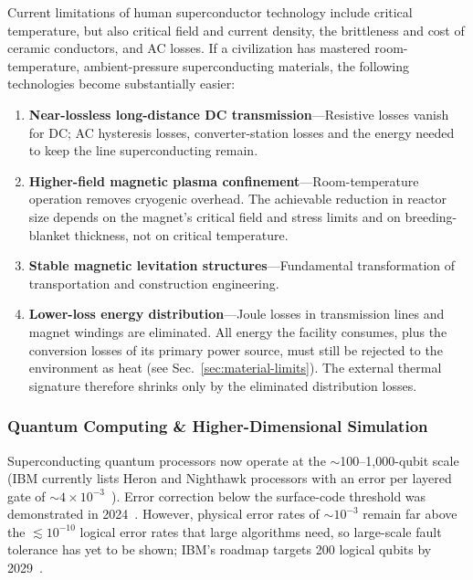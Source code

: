\documentclass[aps,prd,twocolumn,superscriptaddress,nofootinbib]{revtex4-2}
\begin{document}
Current limitations of human superconductor technology include critical temperature, but also critical field and current density, the brittleness and cost of ceramic conductors, and AC losses. If a civilization has mastered room-temperature, ambient-pressure superconducting materials, the following technologies become substantially easier:

\begin{enumerate}
  \item \textbf{Near-lossless long-distance DC transmission}---Resistive losses vanish for DC; AC hysteresis losses, converter-station losses and the energy needed to keep the line superconducting remain.
  \item \textbf{Higher-field magnetic plasma confinement}---Room-temperature operation removes cryogenic overhead. The achievable reduction in reactor size depends on the magnet's critical field and stress limits and on breeding-blanket thickness, not on critical temperature.
  \item \textbf{Stable magnetic levitation structures}---Fundamental transformation of transportation and construction engineering.
  \item \textbf{Lower-loss energy distribution}---Joule losses in transmission lines and magnet windings are eliminated. All energy the facility consumes, plus the conversion losses of its primary power source, must still be rejected to the environment as heat (see Sec.~\ref{sec:material-limits}). The external thermal signature therefore shrinks only by the eliminated distribution losses.
\end{enumerate}

\subsubsection{Quantum Computing \& Higher-Dimensional Simulation}\label{sec:quantum-computing}

Superconducting quantum processors now operate at the ${\sim}$100--1,000-qubit scale (IBM currently lists Heron and Nighthawk processors with an error per layered gate of ${\sim}4\times10^{-3}$~\cite{IBM_Quantum}). Error correction below the surface-code threshold was demonstrated in 2024~\cite{GoogleQuantumAI2025}. However, physical error rates of ${\sim}10^{-3}$ remain far above the $\lesssim10^{-10}$ logical error rates that large algorithms need, so large-scale fault tolerance has yet to be shown; IBM's roadmap targets 200 logical qubits by 2029~\cite{IBM_Quantum}.
\end{document}
